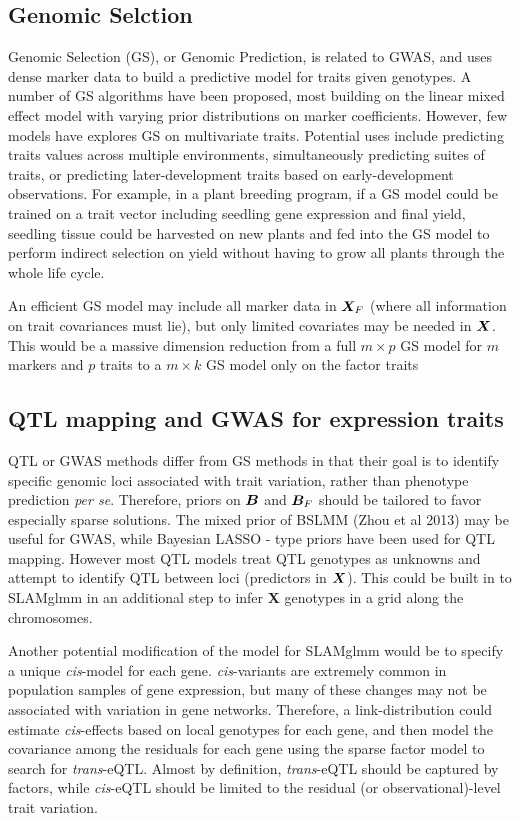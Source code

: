\documentclass[11pt]{amsart}
\newcommand*{\B}[1]{\ifmmode\bm{#1}\else\textbf{#1}\fi}
\begin{document}
\subsection{Genomic Selction}
Genomic Selection (GS), or Genomic Prediction, is related to GWAS, and uses dense marker data to build a predictive model for traits given genotypes. A number of GS algorithms have been proposed, most building on the linear mixed effect model with varying prior distributions on marker coefficients. However, few models have explores GS on multivariate traits. Potential uses include predicting traits values across multiple environments, simultaneously predicting suites of traits, or predicting later-development traits based on early-development observations. For example, in a plant breeding program, if a GS model could be trained on a trait vector including seedling gene expression and final yield, seedling tissue could be harvested on new plants and fed into the GS model to perform indirect selection on yield without having to grow all plants through the whole life cycle.

An efficient GS model may include all marker data in $\B{X}_F$ (where all information on trait covariances must lie), but only limited covariates may be needed in $\B{X}$. This would be a massive dimension reduction from a full $m \times p$ GS model for $m$ markers and $p$ traits to a $m \times k$ GS model only on the factor traits

\subsection{QTL mapping and GWAS for expression traits}
QTL or GWAS methods differ from GS methods in that their goal is to identify specific genomic loci associated with trait variation, rather than phenotype prediction \emph{per se}. Therefore, priors on $\B{B}$ and $\B{B}_F$ should be tailored to favor especially sparse solutions. The mixed prior of BSLMM (Zhou et al 2013) may be useful for GWAS, while Bayesian LASSO - type priors have been used for QTL mapping. However most QTL models treat QTL genotypes as unknowns and attempt to identify QTL between loci (predictors in $\B{X}$). This could be built in to SLAMglmm in an additional step to infer \B{X} genotypes in a grid along the chromosomes.

Another potential modification of the model for SLAMglmm would be to specify a unique \emph{cis}-model for each gene. \emph{cis}-variants are extremely common in population samples of gene expression, but many of these changes may not be associated with variation in gene networks. Therefore, a link-distribution could estimate \emph{cis}-effects based on local genotypes for each gene, and then model the covariance among the residuals for each gene using the sparse factor model to search for \emph{trans}-eQTL. Almost by definition, \emph{trans}-eQTL should be captured by factors, while \emph{cis}-eQTL should be limited to the residual (or observational)-level trait variation.
\end{document}
